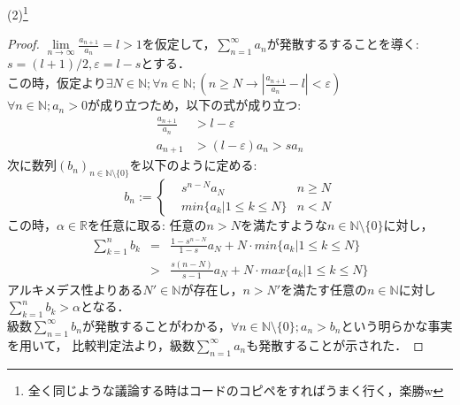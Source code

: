 \documentclass{jarticle}
\begin{document}
\newpage
\noindent
(2)\footnote{全く同じような議論する時はコードのコピペをすればうまく行く，楽勝w}
\begin{proof}
$\lim\limits_{n \to \infty} \frac{a_{n+1}}{a_n}=l>1$を仮定して，$\sum\limits_{n=1}^{\infty}a_n$が発散するすることを導く:\\
$s=(l+1)/2, \varepsilon =l-s$とする．\\
この時，仮定より$\exists N \in \mathbb{N}; \forall n \in \mathbb{N} ; \left( n \ge N \rightarrow \left|\frac{a_{n+1}}{a_n} -l \right| < \varepsilon \right) $\\
$\forall n \in \mathbb{N} ; a_n >0$が成り立つため，以下の式が成り立つ:\\
\begin{equation}
\begin{aligned}
\frac{a_{n+1}}{a_n} &> l - \varepsilon \\
a_{n+1} &>(l - \varepsilon) a_n > sa_n
\end{aligned}
\end{equation}
次に数列$(b_n)_{n \in \mathbb{N} \setminus \{0\}}$を以下のように定める:\\
\begin{equation}
b_n := 
		\left\{ 
		\begin{aligned}
		&s^{n-N} a_N & n \ge N\\
		&min\{a_k|1 \le k \le N \} & n<N 
		\end{aligned} \right.
\end{equation}
この時，$\alpha \in \mathbb{R}$を任意に取る:
任意の$n>N$を満たすような$n \in \mathbb{N} \setminus \{0\}$に対し，\\
\begin{equation}
\begin{aligned}
\sum\limits_{k=1}^{n} b_k &=& \frac{1-s^{n-N}}{1-s} a_N + N \cdot min\{a_k|1 \le k \le N \} \\
			   &>& \frac{s(n-N)}{s-1} a_N + N \cdot max\{a_k|1 \le k \le N \}
\end{aligned}
\end{equation}
アルキメデス性よりある$N' \in \mathbb{N}$が存在し，$n>N'$を満たす任意の$n \in \mathbb{N}$に対し$\sum\limits_{k=1}^{n} b_k > \alpha$となる．\\			   
級数$\sum\limits_{n=1}^{\infty} b_n$が発散することがわかる，$\forall n \in  \mathbb{N} \setminus \{0\} ; a_n > b_n$という明らかな事実を用いて，
比較判定法より，級数$\sum\limits_{n=1}^{\infty} a_n$も発散することが示された．
\end{proof}
\newpage
\end{document}

